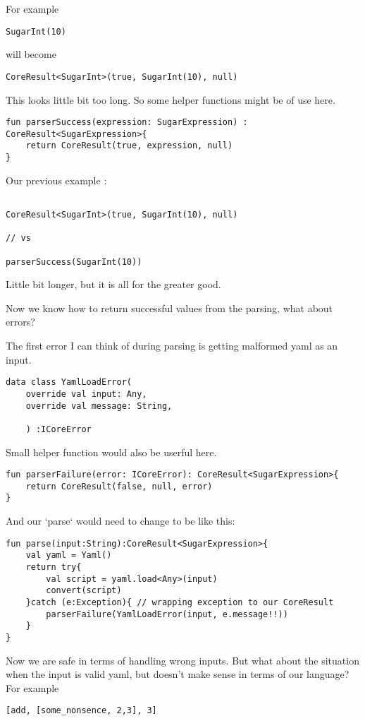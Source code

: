 \documentclass[11pt]{article}
\begin{document}
For example
\begin{verbatim}
SugarInt(10)
\end{verbatim}

will become
\begin{verbatim}
CoreResult<SugarInt>(true, SugarInt(10), null)
\end{verbatim}

This  looks little bit too long. So some helper functions might be of use here.

\begin{verbatim}
fun parserSuccess(expression: SugarExpression) : CoreResult<SugarExpression>{
    return CoreResult(true, expression, null)
}
\end{verbatim}

Our previous example :
\begin{verbatim}

CoreResult<SugarInt>(true, SugarInt(10), null)

// vs

parserSuccess(SugarInt(10))
\end{verbatim}

Little bit longer, but it is all for the greater good.


Now we know how to return successful values from the parsing, what about errors?

The first error I can think of during parsing is getting malformed yaml as an input.

\begin{verbatim}
data class YamlLoadError(
    override val input: Any,
    override val message: String,

    ) :ICoreError
\end{verbatim}

Small helper function would also be userful here.
\begin{verbatim}
fun parserFailure(error: ICoreError): CoreResult<SugarExpression>{
    return CoreResult(false, null, error)
}
\end{verbatim}

And our `parse` would need to change to be like this:
\begin{verbatim}
fun parse(input:String):CoreResult<SugarExpression>{
    val yaml = Yaml()
    return try{
        val script = yaml.load<Any>(input)
        convert(script)
    }catch (e:Exception){ // wrapping exception to our CoreResult
        parserFailure(YamlLoadError(input, e.message!!))
    }
}
\end{verbatim}
Now we are safe in terms of handling wrong inputs. But what about the situation when the input is valid yaml, but doesn't make sense in terms of our language?
For example
\begin{verbatim}
[add, [some_nonsence, 2,3], 3]
\end{verbatim}
\end{document}

